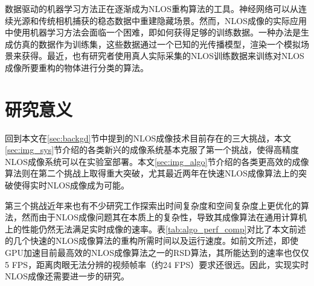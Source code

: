\documentclass[master]{shtthesis}             %
\begin{document}
数据驱动的机器学习方法正在逐渐成为NLOS重构算法的工具。神经网络可以从连续光源和传统相机捕获的稳态数据中重建隐藏场景\citep{tancik2018data,chen2019steady}。然而，NLOS成像的实际应用中使用机器学习方法会面临一个困难，即如何获得足够的训练数据。一种办法是生成仿真的数据作为训练集，这些数据通过一个已知的光传播模型，渲染一个模拟场景来获得。最近，也有研究者使用真人实际采集的NLOS训练数据来训练对NLOS成像所要重构的物体进行分类的算法\citep{caramazza2018neural}。

\section{研究意义}\label{sec:research_meaning}

回到本文在\ref{sec:backgd}节中提到的NLOS成像技术目前存在的三大挑战，本文\ref{sec:img_sys}节介绍的各类新兴的成像系统基本克服了第一个挑战，使得高精度NLOS成像系统可以在实验室部署。本文\ref{sec:img_algo}节介绍的各类更高效的成像算法则在第二个挑战上取得重大突破，尤其最近两年在快速NLOS成像算法上的突破使得实时NLOS成像成为可能。

第三个挑战近年来也有不少研究工作探索出时间复杂度和空间复杂度上更优化的算法，然而由于NLOS成像问题其在本质上的复杂性，导致其成像算法在通用计算机上的性能仍然无法满足实时成像的速率。表\ref{tab:algo_perf_comp}对比了本文前述的几个快速的NLOS成像算法的重构所需时间以及运行速度。如前文所述，即使GPU加速目前最高效的NLOS成像算法之一的RSD算法，其所能达到的速率也仅仅5 FPS\citep{nam2021low}，距离肉眼无法分辨的视频帧率（约24 FPS\citep{read2000restoration}）要求还很远。因此，实现实时NLOS成像还需要进一步的研究。
\end{document}
